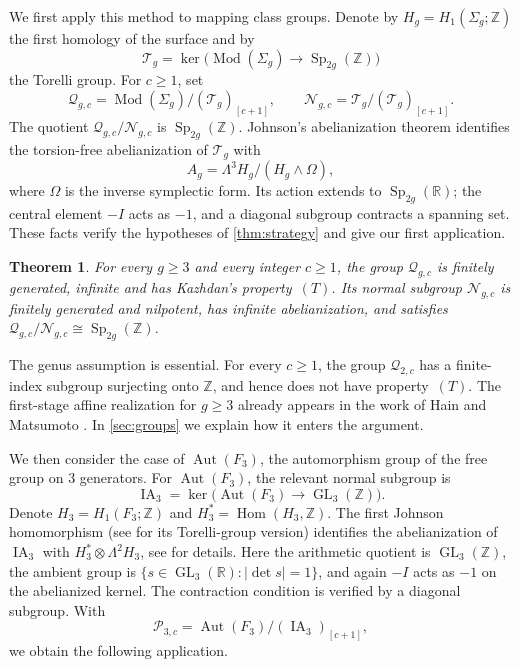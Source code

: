 \documentclass[11pt,a4paper]{article}
\newtheorem{maintheorem}{Theorem}
\theoremstyle{definition}
\newcommand{\R}{\mathbb R}
\newcommand{\Z}{\mathbb Z}
\newcommand{\Mod}{\operatorname{Mod}}
\newcommand{\Sp}{\operatorname{Sp}}
\newcommand{\GL}{\operatorname{GL}}
\newcommand{\Aut}{\operatorname{Aut}}
\newcommand{\Hom}{\operatorname{Hom}}
\newcommand{\rt}{(T)}
\begin{document}
We first apply this method to mapping class groups. Denote by
\(H_g=H_1(\Sigma_g;\Z)\) the first homology of the surface and by
\[
 \mathcal{T}_g
 =\ker\bigl(\Mod(\Sigma_g)\longrightarrow\Sp_{2g}(\Z)\bigr)
\]
the Torelli group. For \(c\ge1\), set
\[
 \mathcal{Q}_{g,c}=\Mod(\Sigma_g)/(\mathcal{T}_g)_{[c+1]},
 \qquad
 \mathcal{N}_{g,c}=\mathcal{T}_g/(\mathcal{T}_g)_{[c+1]}.
\]
The quotient \(\mathcal{Q}_{g,c}/\mathcal{N}_{g,c}\) is
\(\Sp_{2g}(\Z)\).
Johnson's abelianization theorem \cite{JohnsonIII} identifies
the torsion-free abelianization of \(\mathcal{T}_g\) with
\[
 A_g=\Lambda^3H_g/(H_g\wedge\Omega),
\]
where \(\Omega\) is the inverse symplectic form.
Its action extends to \(\Sp_{2g}(\R)\); the central element
\(-I\) acts as \(-1\), and a diagonal subgroup contracts a
spanning set. These facts verify the hypotheses of
\cref{thm:strategy} and give our first application.

\begin{maintheorem}\label{thm:main}
For every \(g\ge3\) and every integer \(c\ge1\), the group
\(\mathcal{Q}_{g,c}\) is finitely generated, infinite and has
Kazhdan's property~\(\rt\). Its normal subgroup \(\mathcal{N}_{g,c}\)
is finitely generated and nilpotent, has infinite abelianization,
and satisfies \(\mathcal{Q}_{g,c}/\mathcal{N}_{g,c}\cong\Sp_{2g}(\Z)\).
\end{maintheorem}

The genus assumption is essential. For every \(c\ge1\), the
group \(\mathcal{Q}_{2,c}\) has a finite-index subgroup surjecting
onto \(\Z\), and hence does not have property~\(\rt\).
The first-stage affine realization for \(g\ge3\) already appears
in the work of Hain and Matsumoto \cite[Lemma~6.3]{HainMatsumoto}.
In \cref{sec:groups} we explain how it enters the argument.

We then consider the case of \(\Aut(F_3)\), the automorphism group of the free group on \(3\) generators.
For \(\Aut(F_3)\), the relevant normal subgroup is
\[
 \operatorname{IA}_3
 =\ker\bigl(\Aut(F_3)\longrightarrow\GL_3(\Z)\bigr).
\]
Denote \(H_3=H_1(F_3;\Z)\) and \(H_3^*=\Hom(H_3,\Z)\).
The first Johnson homomorphism (see \cite{Johnson1980} for its Torelli-group
version) identifies the abelianization of
\(\operatorname{IA}_3\) with
\(H_3^*\otimes\Lambda^2H_3\), see \cite{SatohSurvey} for details.
Here the arithmetic quotient is \(\GL_3(\Z)\), the ambient group
is
\(\{s\in\GL_3(\R):\lvert\det s\rvert=1\}\), and again
\(-I\) acts as \(-1\) on the abelianized kernel.
The contraction condition is verified by a diagonal subgroup.
With
\[
 \mathcal{P}_{3,c}
 =\Aut(F_3)/(\operatorname{IA}_3)_{[c+1]},
\]
we obtain the following application.
\end{document}
